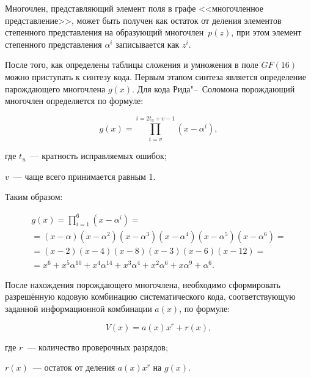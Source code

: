 Многочлен, представляющий элемент поля в графе <<многочленное
представление>>, может быть получен как остаток от деления элементов
степенного представления на образующий многочлен~$p(z)$, при этом
элемент степенного представления $\alpha^i$ записывается как $z^i$.





После того, как определены таблицы сложения и умножения в поле
$GF(16)$ можно приступать к синтезу кода. Первым этапом синтеза
является определение парождающего многочлена $g(x)$. Для кода
Рида"--~Соломона порождающий многочлен определяется по формуле:

\begin{equation*}
  g(x) = \prod_{i = v}^{i = 2t_u + v -1}(x - \alpha^i), 
\end{equation*}

\begin{ESKDexplanation}
\item[где ] $t_u$~--- кратность исправляемых ошибок;
\item $v$~--- чаще всего принимается равным 1.
\end{ESKDexplanation}

Таким образом:

\begin{gather*}
  g(x) = \prod_{i =1}^6 (x - \alpha^i) = \\
  = (x - \alpha)(x - \alpha^2)(x - \alpha^3)(x - \alpha^4)(x - \alpha^5)(x - \alpha^6) = \\
  = (x -2)(x - 4)(x -8)(x-3)(x-6)(x-12) = \\
  = x^6 + x^5\alpha^{10} + x^4\alpha^{14} + x^3\alpha^4 + x^2\alpha^6
  + x\alpha^9 + \alpha^6.
\end{gather*}

После нахождения порождающего многочлена, необходимо сформировать
разрешённую кодовую комбинацию систематического кода, соответствующую
заданной информационной комбинации $a(x)$, по формуле:

\begin{equation*}
  V(x) = a(x)x^r + r(x),
\end{equation*}

\begin{ESKDexplanation}
\item[где ] $r$~--- количество проверочных разрядов;
\item $r(x)$~--- остаток от деления $a(x)x^r$ на $g(x)$.
\end{ESKDexplanation}


